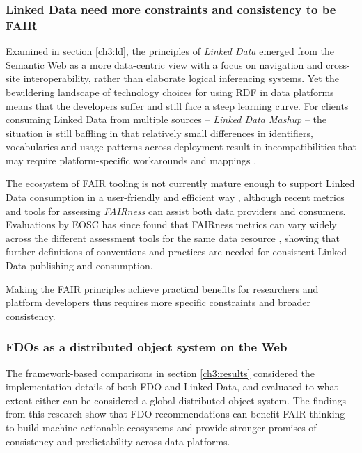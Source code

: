 \subsubsection{Linked Data need more constraints and consistency to be FAIR}

Examined in section \vref{ch3:ld}, the principles of \emph{Linked Data} emerged from the Semantic Web as a more data-centric view with a focus on navigation and cross-site interoperability, rather than elaborate logical inferencing systems.  
Yet the bewildering landscape of technology choices for using RDF in data platforms means that the developers suffer and still face a steep learning curve. 
For clients consuming Linked Data from multiple sources -- \emph{Linked Data Mashup} \cite{Tran 2014} -- the situation is still baffling in that relatively small differences in identifiers, vocabularies and usage patterns across deployment result in incompatibilities that may require platform-specific workarounds and mappings \cite{Millard 2010}. 

The ecosystem of FAIR tooling is not currently mature enough to support Linked Data consumption in a user-friendly and efficient way \cite{Thompson 2020}, although recent metrics and tools for assessing \emph{FAIRness} \cite{Wilkinson 2018} can assist both data providers and consumers. 
Evaluations by EOSC has since found that FAIRness metrics can vary widely across the different assessment tools for the same data resource \cite{10.5281/zenodo.7463421}, showing that further definitions of conventions and practices are needed for consistent Linked Data publishing and consumption. 

Making the FAIR principles achieve practical benefits for researchers and platform developers thus requires more specific constraints and broader consistency.

\subsubsection{FDOs as a distributed object system on the Web}

The framework-based comparisons in section \vref{ch3:results} considered the implementation details of both FDO and Linked Data, and evaluated to what extent either can be considered a global distributed object system. 
The findings from this research show that FDO recommendations can benefit FAIR thinking to build machine actionable ecosystems and provide stronger promises of consistency and predictability across data platforms. 

